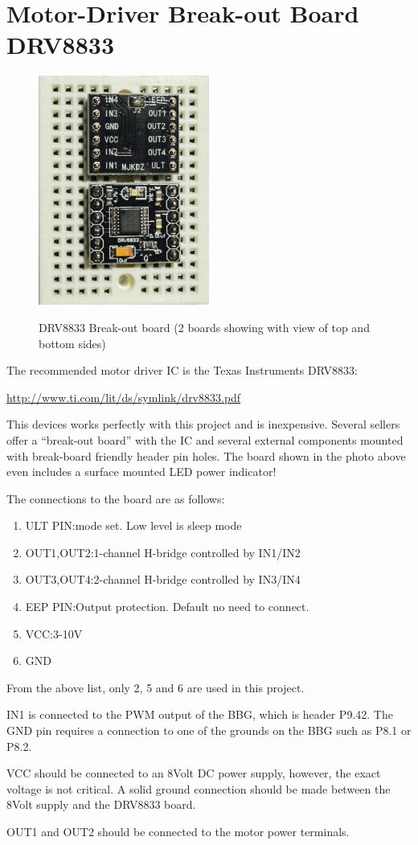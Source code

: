 \chapter{Motor-Driver Break-out Board DRV8833}

\begin{figure}[h]
	\centering
    \includegraphics[width=0.5\textwidth]{photos/drv8833_breakout.jpg}
	\centering\bfseries
	\caption{DRV8833 Break-out board (2 boards showing with view of top and bottom sides)}
\end{figure}


The recommended motor driver IC is the Texas Instruments DRV8833:

\url{http://www.ti.com/lit/ds/symlink/drv8833.pdf}

This devices works perfectly with this project and is inexpensive.
Several sellers offer a ``break-out board'' with the IC and several external components mounted with break-board friendly header pin holes.  The board shown in the photo above even includes a surface mounted LED power indicator!

The connections to the board are as follows:

\begin{enumerate}
\item ULT PIN:mode set. Low level is sleep mode
\item OUT1,OUT2:1-channel H-bridge controlled by IN1/IN2
\item OUT3,OUT4:2-channel H-bridge controlled by IN3/IN4
\item EEP PIN:Output protection. Default no need to connect.
\item VCC:3-10V
\item GND
\end{enumerate}

From the above list, only 2, 5 and 6 are used in this project.

IN1 is connected to the PWM output of the BBG, which is header P9.42.
The GND pin requires a connection to one of the grounds on the BBG such as P8.1 or P8.2.

VCC should be connected to an 8Volt DC power supply, however, the exact voltage is not critical.  A solid ground connection should be made between the 8Volt supply and the DRV8833 board.

OUT1 and OUT2 should be connected to the motor power terminals.

